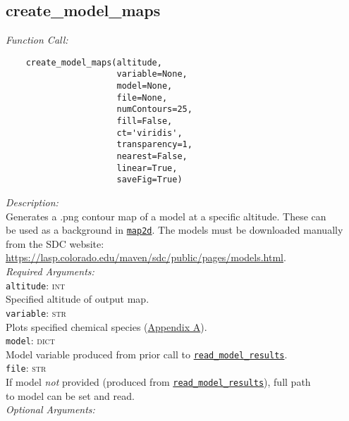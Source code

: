 \documentclass{article}
\begin{document}
\subsection{create\_model\_maps}
\label{subsec:createmodelmaps}
\textit{Function Call:}\\
\vspace{-10mm}
\begin{verbatim}
    create_model_maps(altitude,
                      variable=None,
                      model=None,
                      file=None,
                      numContours=25,
                      fill=False,
                      ct='viridis',
                      transparency=1,
                      nearest=False,
                      linear=True,
                      saveFig=True)
\end{verbatim}
\vspace{-5mm}
\noindent
\textit{Description:}\\
\indent Generates a .png contour map of a model at a specific altitude. These can\\
\indent be used as a background in \hyperref[subsec:map2d]{\texttt{map2d}}. The models must be downloaded manually\\
\indent from the SDC website:\\
\indent \hyperlink{https://lasp.colorado.edu/maven/sdc/public/pages/models.html}{https://lasp.colorado.edu/maven/sdc/public/pages/models.html}.\\
\textit{Required Arguments:}\\
\indent \texttt{altitude}: \textsc{int}\\
\indent \indent Specified altitude of output map.\\
\indent \texttt{variable}: \textsc{str}\\
\indent \indent Plots specified chemical species (\hyperref[sec:chemicalspecies]{Appendix A}).\\
\indent \texttt{model}: \textsc{dict}\\
\indent \indent Model variable produced from prior call to \texttt{\hyperref[subsec:readmodelresults]{read\_model\_results}}.\\
\indent \texttt{file}: \textsc{str}\\
\indent \indent If model \textit{not} provided (produced from \texttt{\hyperref[subsec:readmodelresults]{read\_model\_results}}), full path\\
\indent \indent to model can be set and read.\\
\textit{Optional Arguments:}\\
\end{document}
